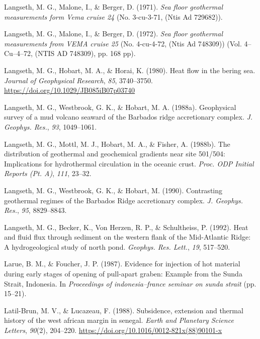 \begin{CSLReferences}{1}{1}
\leavevmode{}%
Langseth, M. G., Malone, I., \& Berger, D. (1971). \emph{Sea floor geothermal measurements form {Vema} cruise 24} (No. 3-cu-3-71, (Ntis Ad 729682)).

\leavevmode{}%
Langseth, M. G., Malone, I., \& Berger, D. (1972). \emph{Sea floor geothermal measurements from VEMA cruise 25} (No. 4-cu-4-72, (Ntis Ad 748309)) (Vol. 4--Cu--4--72, (NTIS AD 748309), pp. 168 pp).

\leavevmode{}%
Langseth, M. G., Hobart, M. A., \& Horai, K. (1980). Heat flow in the bering sea. \emph{Journal of Geophysical Research}, \emph{85}, 3740--3750. \url{https://doi.org/10.1029/JB085iB07p03740}

\leavevmode{}%
Langseth, M. G., Westbrook, G. K., \& Hobart, M. A. (1988a). Geophysical survey of a mud volcano seaward of the {Barbados} ridge accretionary complex. \emph{J. Geophys. Res.}, \emph{93}, 1049--1061.

\leavevmode{}%
Langseth, M. G., Mottl, M. J., Hobart, M. A., \& Fisher, A. (1988b). The distribution of geothermal and geochemical gradients near site 501/504: Implications for hydrothermal circulation in the oceanic crust. \emph{Proc. ODP Initial Reports (Pt. A)}, \emph{111}, 23--32.

\leavevmode{}%
Langseth, M. G., Westbrook, G. K., \& Hobart, M. (1990). Contrasting geothermal regimes of the {Barbados Ridge} accretionary complex. \emph{J. Geophys. Res.}, \emph{95}, 8829--8843.

\leavevmode{}%
Langseth, M. G., Becker, K., Von Herzen, R. P., \& Schultheiss, P. (1992). Heat and fluid flux through sediment on the western flank of the {Mid-Atlantic Ridge}: A hydrogeological study of north pond. \emph{Geophys. Res. Lett.}, \emph{19}, 517--520.

\leavevmode{}%
Larue, B. M., \& Foucher, J. P. (1987). Evidence for injection of hot material during early stages of opening of pull-apart graben: Example from the {Sunda Strait, Indonesia}. In \emph{Proceedings of indonesia--france seminar on sunda strait} (pp. 15--21).

\leavevmode{}%
Latil-Brun, M. V., \& Lucazeau, F. (1988). Subsidence, extension and thermal history of the west african margin in senegal. \emph{Earth and Planetary Science Letters}, \emph{90}(2), 204--220. \url{https://doi.org/10.1016/0012-821x(88)90101-x}


\end{CSLReferences}

